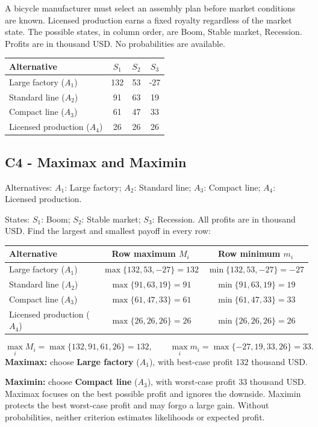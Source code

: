 \clearpage
{}
A bicycle manufacturer must select an assembly plan before market conditions are known. Licensed production earns a fixed royalty regardless of the market state. The possible states, in column order, are Boom, Stable market, Recession. Profits are in thousand USD. No probabilities are available.
\begin{center}
\begin{tabular}{@{}lccc@{}}\toprule
Alternative & $S_1$ & $S_2$ & $S_3$\\\midrule
Large factory ($A_1$) & 132 & 53 & -27\\
Standard line ($A_2$) & 91 & 63 & 19\\
Compact line ($A_3$) & 61 & 47 & 33\\
Licensed production ($A_4$) & 26 & 26 & 26\\
\bottomrule\end{tabular}
\end{center}
\subsection*{C4 - Maximax and Maximin }
\label{sol:bicycle-assembly-c4}
Alternatives: $A_1$: Large factory; $A_2$: Standard line; $A_3$: Compact line; $A_4$: Licensed production.\par
States: $S_1$: Boom; $S_2$: Stable market; $S_3$: Recession.
All profits are in thousand USD. Find the largest and smallest payoff in every row:
\begin{center}
\begin{tabular}{@{}lcc@{}}\toprule
Alternative & Row maximum $M_i$ & Row minimum $m_i$\\\midrule
Large factory ($A_1$) & $\max\{132,53,-27\}=132$ & $\min\{132,53,-27\}=-27$\\
Standard line ($A_2$) & $\max\{91,63,19\}=91$ & $\min\{91,63,19\}=19$\\
Compact line ($A_3$) & $\max\{61,47,33\}=61$ & $\min\{61,47,33\}=33$\\
Licensed production ($A_4$) & $\max\{26,26,26\}=26$ & $\min\{26,26,26\}=26$\\
\bottomrule\end{tabular}
\end{center}
\[\max_i M_i=\max\{132,91,61,26\}=132,\qquad \max_i m_i=\max\{-27,19,33,26\}=33.\]
\textbf{Maximax:} choose \textbf{Large factory} ($A_1$), with best-case profit 132 thousand USD.\par
\textbf{Maximin:} choose \textbf{Compact line} ($A_3$), with worst-case profit 33 thousand USD.
Maximax focuses on the best possible profit and ignores the downside. Maximin protects the best worst-case profit and may forgo a large gain. Without probabilities, neither criterion estimates likelihoods or expected profit.
\par\vspace{4mm}


